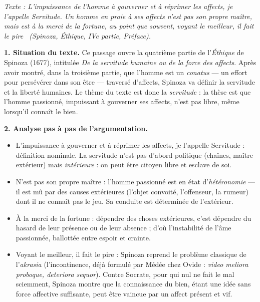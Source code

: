 \documentclass[11pt]{article}
\begin{document}
\begin{corrige}

\emph{Texte : \guillemotleft L'impuissance de l'homme à gouverner et à réprimer les affects, je l'appelle Servitude. Un homme en proie à ses affects n'est pas son propre maître, mais est à la merci de la fortune, au point que souvent, voyant le meilleur, il fait le pire \guillemotright\ (Spinoza, \emph{Éthique}, IVe partie, Préface).}

\textbf{1. Situation du texte.} Ce passage ouvre la quatrième partie de l'\emph{Éthique} de Spinoza (1677), intitulée \emph{De la servitude humaine ou de la force des affects}. Après avoir montré, dans la troisième partie, que l'homme est un \emph{conatus} — un effort pour persévérer dans son être — traversé d'affects, Spinoza va définir la servitude et la liberté humaines. Le thème du texte est donc la \emph{servitude} : la thèse est que l'homme passionné, impuissant à gouverner ses affects, n'est pas libre, même lorsqu'il connaît le bien.

\textbf{2. Analyse pas à pas de l'argumentation.}
\begin{itemize}
\item \guillemotleft L'impuissance à gouverner et à réprimer les affects, je l'appelle Servitude \guillemotright{} : définition nominale. La servitude n'est pas d'abord politique (chaînes, maître extérieur) mais \emph{intérieure} : on peut être citoyen libre et esclave de soi.
\item \guillemotleft N'est pas son propre maître \guillemotright{} : l'homme passionné est en état d'\emph{hétéronomie} — il est mû par des causes extérieures (l'objet convoité, l'offenseur, la rumeur) dont il ne connaît pas le jeu. Sa conduite est déterminée de l'extérieur.
\item \guillemotleft À la merci de la fortune \guillemotright{} : dépendre des choses extérieures, c'est dépendre du hasard de leur présence ou de leur absence ; d'où l'instabilité de l'âme passionnée, ballottée entre espoir et crainte.
\item \guillemotleft Voyant le meilleur, il fait le pire \guillemotright{} : Spinoza reprend le problème classique de l'\emph{akrasia} (l'incontinence, déjà formulé par Médée chez Ovide : \emph{video meliora proboque, deteriora sequor}). Contre Socrate, pour qui nul ne fait le mal sciemment, Spinoza montre que la connaissance du bien, étant une idée sans force affective suffisante, peut être vaincue par un affect présent et vif.
\end{itemize}


\end{corrige}
\end{document}
